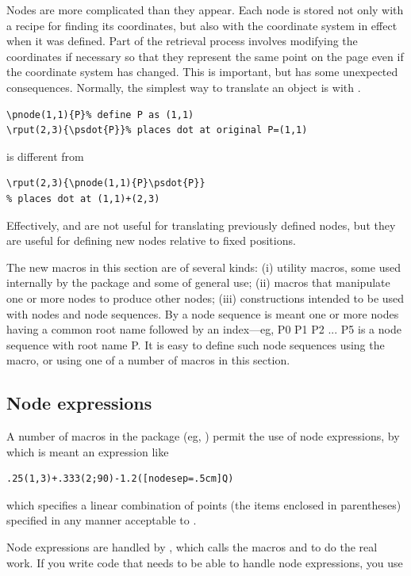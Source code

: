 \documentclass[fontsize=11pt,english,BCOR=10mm,DIV=12,bibliography=totoc,parskip=false,headings=small,
    headinclude=false,footinclude=false,oneside]{pst-doc}
\begin{document}
Nodes are more complicated than they appear. Each node is stored not only with a recipe 
for finding its coordinates, but also with the coordinate system in effect when it was 
defined. Part of the retrieval process involves modifying the coordinates if necessary 
so that they represent the same point on the page even if the coordinate system has 
changed. This is important, but has some unexpected consequences. Normally, the simplest 
way to translate an object is with .
\begin{verbatim}
\pnode(1,1){P}% define P as (1,1)
\rput(2,3){\psdot{P}}% places dot at original P=(1,1)
\end{verbatim}
is different from
\begin{verbatim}
\rput(2,3){\pnode(1,1){P}\psdot{P}}
% places dot at (1,1)+(2,3)
\end{verbatim}
Effectively,  and  are not useful for translating previously 
defined nodes, but they are useful for defining new nodes relative to fixed positions.  

The new macros in this section
are of several kinds: (i) utility macros, some used 
internally by the package and some of general use; (ii) macros that manipulate one or 
more nodes to produce other nodes; (iii) constructions intended to be used with nodes and 
node sequences. By a node sequence is meant one or more nodes having a common root name 
followed by an index---eg, P0 P1 P2 ... P5 is a node sequence with root name P. It is 
easy to define such node sequences using the  macro, or using one of a 
number of macros in this section.




\subsection{Node expressions}
A number of macros in the package (eg, ) permit the use of node expressions, 
by which is meant an expression like
\begin{verbatim}
.25(1,3)+.333(2;90)-1.2([nodesep=.5cm]Q)
\end{verbatim}
which specifies a linear combination of points (the items enclosed in parentheses) 
specified in any manner acceptable to . 

Node expressions are handled by , which calls the macros  and 
 to do the real work. If you write code that needs to be able to handle node expressions, you use
\end{document}
